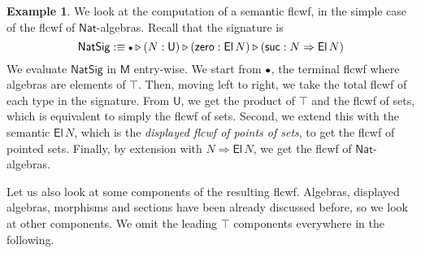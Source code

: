 \documentclass[12pt,a4paper,twoside,openany]{book}
\theoremstyle{remark}
\theoremstyle{definition}
\newtheorem{myexample}{Example}
\theoremstyle{theorem}
\newcommand{\ms}[1]{\mathsf{#1}}
\newcommand{\bs}[1]{\boldsymbol{#1}}
\newcommand{\zero}{\ms{zero}}
\newcommand{\suc}{\ms{suc}}
\newcommand{\U}{\mathsf{U}}
\newcommand{\El}{\mathsf{El}}
\newcommand{\ext}{\triangleright}
\newcommand{\emptycon}{\scaleobj{.75}\bullet}
\newcommand{\funi}{\Rightarrow}
\newcommand{\bemptycon}{\scaleobj{.75}{\bs{\bullet}}}
\newcommand{\bM}{\bs{\mathsf{M}}}
\newcommand{\Nat}{\ms{Nat}}
\newcommand{\defn}{:\equiv}
\begin{document}
\begin{myexample}
We look at the computation of a semantic flcwf, in the simple case of the flcwf
of $\Nat$-algebras. Recall that the signature is
\[
  \ms{NatSig} \defn \emptycon \ext (N : \U) \ext (\zero : \El\,N) \ext (\suc : N \funi \El\,N)
\]
We evaluate $\ms{NatSig}$ in $\bM$ entry-wise. We start from $\bemptycon$, the
terminal flcwf where algebras are elements of $\top$. Then, moving left to
right, we take the total flcwf of each type in the signature. From $\U$, we get
the product of $\top$ and the flcwf of sets, which is equivalent to simply the
flcwf of sets. Second, we extend this with the semantic $\El\,N$, which is the
\emph{displayed flcwf of points of sets}, to get the flcwf of pointed
sets. Finally, by extension with $N \funi \El\,N$, we get the flcwf of
$\Nat$-algebras.

Let us also look at some components of the resulting flcwf. Algebras, displayed
algebras, morphisms and sections have been already discussed before, so we look
at other components. We omit the leading $\top$ components everywhere in the following.


\end{myexample}
\end{document}

